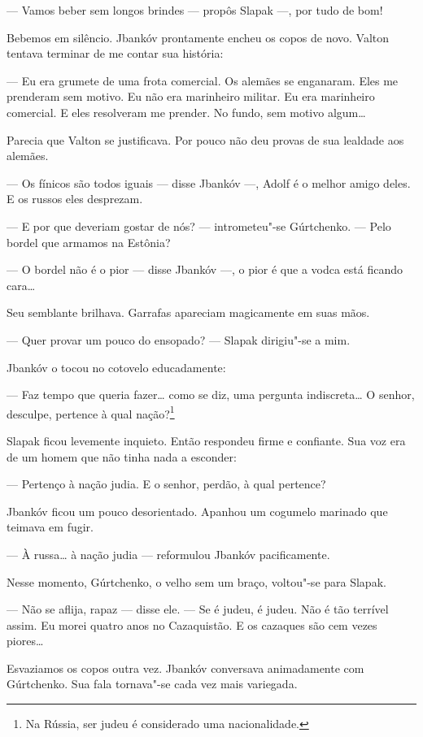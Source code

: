 --- Vamos beber sem longos brindes --- propôs Slapak ---, por tudo de
bom!

Bebemos em silêncio. Jbankóv prontamente encheu os copos de novo. Valton
tentava terminar de me contar sua história:

--- Eu era grumete de uma frota comercial. Os alemães se enganaram. Eles
me prenderam sem motivo. Eu não era marinheiro militar. Eu era
marinheiro comercial. E eles resolveram me prender. No fundo, sem motivo
algum\ldots{}

Parecia que Valton se justificava. Por pouco não deu provas de sua
lealdade aos alemães.

--- Os fínicos são todos iguais --- disse Jbankóv ---, Adolf é o melhor
amigo deles. E os russos eles desprezam.

--- E por que deveriam gostar de nós? --- intrometeu"-se Gúrtchenko. ---
Pelo bordel que armamos na Estônia?

--- O bordel não é o pior --- disse Jbankóv ---, o pior é que a vodca
está ficando cara\ldots{}

Seu semblante brilhava. Garrafas apareciam magicamente em suas mãos.

--- Quer provar um pouco do ensopado? --- Slapak dirigiu"-se a mim.

Jbankóv o tocou no cotovelo educadamente:

--- Faz tempo que queria fazer\ldots{} como se diz, uma pergunta
indiscreta\ldots{} O senhor, desculpe, pertence à qual nação?\footnote{Na
  Rússia, ser judeu é considerado uma nacionalidade.}

Slapak ficou levemente inquieto. Então respondeu firme e confiante. Sua
voz era de um homem que não tinha nada a esconder:

--- Pertenço à nação judia. E o senhor, perdão, à qual pertence?

Jbankóv ficou um pouco desorientado. Apanhou um cogumelo marinado que teimava em fugir.

--- À russa\ldots{} à nação judia --- reformulou Jbankóv pacificamente.

Nesse momento, Gúrtchenko, o velho sem um braço, voltou"-se para Slapak.

--- Não se aflija, rapaz --- disse ele. --- Se é judeu, é judeu. Não é
tão terrível assim. Eu morei quatro anos no Cazaquistão. E os cazaques
são cem vezes piores\ldots{}

Esvaziamos os copos outra vez. Jbankóv conversava animadamente com
Gúrtchenko. Sua fala tornava"-se cada vez mais variegada.

